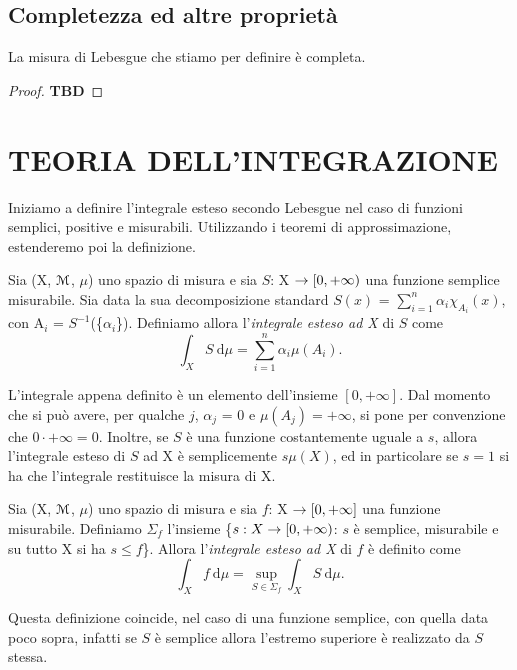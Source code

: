 \documentclass[Completo.tex]{subfiles}
\begin{document}
\subsection{Completezza ed altre proprietà}
\begin{Prop}
	La misura di Lebesgue che stiamo per definire è completa.
\end{Prop}
\begin{proof}
	\textbf{TBD}
\end{proof}
\section{TEORIA DELL'INTEGRAZIONE}
Iniziamo a definire l'integrale esteso secondo Lebesgue nel caso di funzioni semplici, positive e misurabili. Utilizzando i teoremi di approssimazione, estenderemo poi la definizione.
\begin{Def}
	Sia (X, $\eu[M]$, $\mu$) uno spazio di misura e sia $S$: X $\rightarrow [0, +\infty)$ una funzione semplice misurabile. Sia data la sua decomposizione standard $S(x)$ = $\sum_{i = 1}^{n} \alpha_i \chi_{A_i}(x)$, con A$_i$ = $S^{-1}$(\{$\alpha_i$\}). Definiamo allora l'\textit{integrale esteso ad X} di $S$ come
	\begin{equation*}
	\int_X S \ \mathrm{d}\mu = \sum\limits_{i=1}^{n} \alpha_i \mu(A_i).
	\end{equation*}
\end{Def}
\begin{Oss}
	L'integrale appena definito è un elemento dell'insieme $[0, +\infty]$. Dal momento che si può avere, per qualche $j$, $\alpha_j$ = 0 e $\mu(A_j) = +\infty$, si pone per convenzione che $0 \cdot +\infty = 0$. Inoltre, se $S$ è una funzione costantemente uguale a $s$, allora l'integrale esteso di $S$ ad X è semplicemente $s \mu(X)$, ed in particolare se $s = 1$ si ha che l'integrale restituisce la misura di X.
\end{Oss}
\begin{Def}
	Sia (X, $\eu[M]$, $\mu$) uno spazio di misura e sia $f$: X $\rightarrow [0, +\infty]$ una funzione  misurabile. Definiamo $\Sigma_f$ l'insieme \{$s: X \rightarrow [0, +\infty)$: $s$ è semplice, misurabile e su tutto X si ha $s \leq f$\}. Allora l'\textit{integrale esteso ad X} di $f$ è definito come
	\begin{equation*}
	\int_X f \ \mathrm{d}\mu = \sup\limits_{S \in \Sigma_f} \int_X S \ \mathrm{d}\mu.
	\end{equation*}
 \end{Def}
\begin{Oss}
	Questa definizione coincide, nel caso di una funzione semplice, con quella data poco sopra, infatti se $S$ è semplice allora l'estremo superiore è realizzato da $S$ stessa.
\end{Oss}
\end{document}
